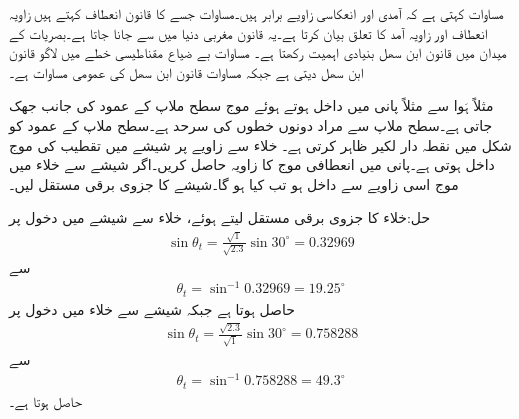 مساوات  کہتی ہے کہ آمدی اور انعکاسی زاویے برابر ہیں۔مساوات  جسے  کا قانون انعطاف  کہتے ہیں زاویہ انعطاف اور زاویہ آمد کا تعلق بیان کرتا ہے۔یہ قانون مغربی دنیا میں  سے جانا جاتا ہے۔بصریات کے میدان میں قانون ابن سھل بنیادی اہمیت رکھتا ہے۔ مساوات  بے ضیاع مقناطیسی خطے میں لاگو قانون ابن سھل دیتی ہے جبکہ مساوات  قانون ابن سھل کی عمومی مساوات ہے۔

 مثلاً ہَوا سے  مثلاً پانی میں داخل ہوتے ہوئے موج سطح ملاپ کے عمود کی جانب جھک جاتی ہے۔سطح ملاپ سے مراد دونوں خطوں کی سرحد ہے۔سطح ملاپ کے عمود کو شکل  میں نقطہ دار لکیر ظاہر کرتی ہے۔
خلاء سے  زاویے پر شیشے میں   تقطیب کی موج داخل ہوتی ہے۔پانی میں انعطافی موج کا زاویہ  حاصل کریں۔اگر شیشے سے خلاء میں موج اسی زاویے سے داخل ہو تب  کیا ہو گا۔شیشے کا جزوی برقی مستقل  لیں۔

حل:خلاء کا جزوی برقی مستقل  لیتے ہوئے، خلاء سے شیشے میں دخول پر
\begin{align*}
\sin \theta_t = \frac{\sqrt{1}}{\sqrt{2.3}} \sin 30^\circ= 0.32969
\end{align*}
سے
\begin{align*}
\theta_t =\sin^{-1} 0.32969=19.25^\circ
\end{align*}
حاصل ہوتا ہے جبکہ شیشے سے خلاء میں دخول پر
\begin{align*}
\sin \theta_t = \frac{\sqrt{2.3}}{\sqrt{1}} \sin 30^\circ= 0.758288
\end{align*}
سے
\begin{align*}
\theta_t =\sin^{-1} 0.758288=49.3^\circ
\end{align*}
حاصل ہوتا ہے۔

